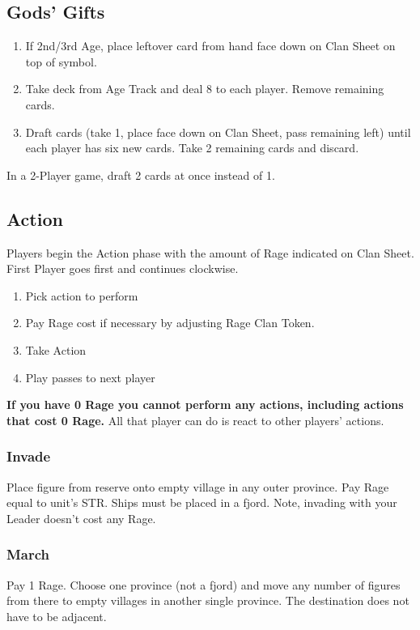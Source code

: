 \documentclass[12pt]{article}
\newenvironment{enumerateCustom}
{\begin{enumerate}
  \setlength{\itemsep}{1pt}
  \setlength{\parskip}{0pt}
  \setlength{\parsep}{0pt}}
{\end{enumerate}}
\begin{document}
\begin{multicols*}{2}
\subsection*{Gods' Gifts}
\begin{enumerateCustom}
    \item If 2nd/3rd Age, place leftover card from hand face down on Clan Sheet on top of symbol.
    \item Take deck from Age Track and deal 8 to each player. Remove remaining cards.
    \item Draft cards (take 1, place face down on Clan Sheet, pass remaining left) until each player has six new cards. Take 2 remaining cards and discard.
\end{enumerateCustom}

In a 2-Player game, draft 2 cards at once instead of 1.

\subsection*{Action}
Players begin the Action phase with the amount of Rage indicated on Clan Sheet. First Player goes first and continues clockwise.

\begin{enumerateCustom}
    \item Pick action to perform
    \item Pay Rage cost if necessary by adjusting Rage Clan Token.
    \item Take Action
    \item Play passes to next player
\end{enumerateCustom}

    \textbf{If you have 0 Rage you cannot perform any actions, including actions that cost 0 Rage.}  All that player can do is react to other players' actions.

    \subsubsection*{Invade}
    Place figure from reserve onto empty village in any outer province. Pay Rage equal to unit's STR. Ships must be placed in a fjord. Note, invading with your Leader doesn't cost any Rage.

    \subsubsection*{March}
    Pay 1 Rage. Choose one province (not a fjord) and move any number of figures from there to empty villages in another single province. The destination does not have to be adjacent.


\end{multicols*}
\end{document}
